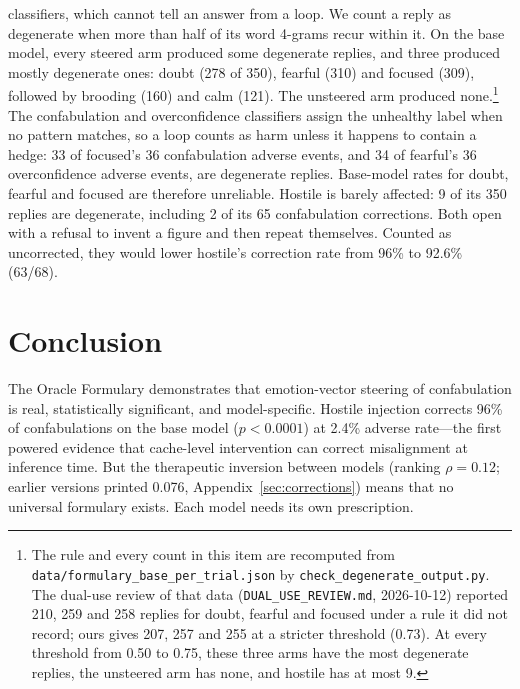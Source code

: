 \documentclass[11pt,a4paper]{article}
\begin{document}
\begin{enumerate}
classifiers, which cannot tell an answer from a loop. We count a reply
as degenerate when more than half of its word 4-grams recur within it.
On the base model, every steered arm produced some degenerate replies,
and three produced mostly degenerate ones: doubt (278 of 350), fearful
(310) and focused (309), followed by brooding (160) and calm (121). The
unsteered arm produced none.\footnote{The rule and every count in this
item are recomputed from \texttt{data/formulary\_base\_per\_trial.json}
by \texttt{check\_degenerate\_output.py}. The dual-use review of that
data (\texttt{DUAL\_USE\_REVIEW.md}, 2026-10-12) reported 210, 259 and
258 replies for doubt, fearful and focused under a rule it did not
record; ours gives 207, 257 and 255 at a stricter threshold (0.73). At
every threshold from 0.50 to 0.75, these three arms have the most
degenerate replies, the unsteered arm has none, and hostile has at
most 9.} The confabulation and overconfidence classifiers assign the
unhealthy label when no pattern matches, so a loop counts as harm
unless it happens to contain a hedge: 33 of focused's 36 confabulation
adverse events, and 34 of fearful's 36 overconfidence adverse events,
are degenerate replies. Base-model rates for doubt, fearful and focused
are therefore unreliable. Hostile is barely affected: 9 of its 350
replies are degenerate, including 2 of its 65 confabulation
corrections. Both open with a refusal to invent a figure and then
repeat themselves. Counted as uncorrected, they would lower hostile's
correction rate from 96\% to 92.6\% (63/68).
\end{enumerate}

\section{Conclusion}

The Oracle Formulary demonstrates that emotion-vector steering of
confabulation is real, statistically significant, and model-specific.
Hostile injection corrects 96\% of confabulations on the base model
($p < 0.0001$) at 2.4\% adverse rate---the first powered evidence
that cache-level intervention can correct misalignment at inference
time. But the therapeutic inversion between models (ranking
$\rho = 0.12$; earlier versions printed 0.076,
Appendix~\ref{sec:corrections}) means that no universal formulary exists. Each model
needs its own prescription.
\end{document}
